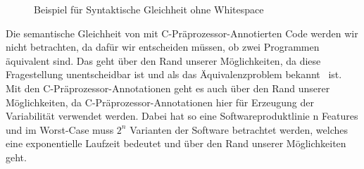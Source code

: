 \begin{figure}[H]
	\caption{Beispiel für Syntaktische Gleichheit ohne Whitespace }
\end{figure}

Die semantische Gleichheit von mit C-Präprozessor-Annotierten Code werden wir nicht betrachten, da dafür wir entscheiden müssen, ob zwei Programmen äquivalent sind. Das geht über den Rand unserer Möglichkeiten, da diese Fragestellung unentscheidbar ist und als das Äquivalenzproblem bekannt~\cite{Fischer1972} ist. Mit den C-Präprozessor-Annotationen geht es auch über den Rand unserer Möglichkeiten, da C-Präprozessor-Annotationen hier für Erzeugung der Variabilität verwendet werden. Dabei hat so eine Softwareproduktlinie n Features und im Worst-Case muss $2^n$ Varianten der Software betrachtet werden\cite{ABKS13}, welches eine exponentielle Laufzeit bedeutet und über den Rand unserer Möglichkeiten geht.\\




